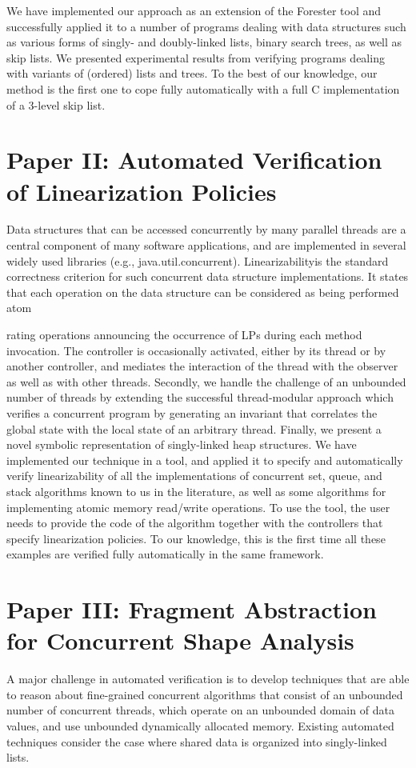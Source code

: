 We have implemented our approach as an extension of the Forester tool and successfully applied it to a number of programs dealing with data structures such as various forms of singly- and doubly-linked lists, binary search trees, as well as skip lists. We presented experimental results from verifying programs dealing with variants of (ordered) lists and trees. To the best of our knowledge, our method is the first one to cope fully automatically with a full C implementation of a 3-level skip list. 

\section{Paper II: Automated Verification of Linearization Policies} 
Data structures that can be accessed concurrently by many parallel threads are a central component of many software applications, and are implemented in several widely used libraries (e.g., java.util.concurrent). Linearizabilityis the standard correctness criterion for such concurrent data structure implementations. It states that each operation on the data structure can be considered as being performed atom





rating operations announcing the occurrence of
LPs during each method invocation. The controller is occasionally activated, either by
its thread or by another controller, and mediates the interaction of the thread with the
observer as well as with other threads. Secondly, we handle the challenge of an unbounded number of threads by extending the successful thread-modular approach which verifies a concurrent program by generating an invariant that correlates the global state with the local state of an arbitrary thread. Finally,  we present a novel symbolic representation of singly-linked heap structures.
We have implemented our technique in a tool, and applied it to specify and automatically verify linearizability of all the implementations of concurrent set, queue,
and stack algorithms known to us in the literature, as well as some algorithms for implementing atomic memory read/write operations. To use the tool, the user needs to
provide the code of the algorithm together with the controllers that specify linearization
policies. To our knowledge, this is the first time all these examples are verified fully
automatically in the same framework.
\section{Paper III: Fragment Abstraction for Concurrent Shape Analysis}  
A major challenge in automated verification is to develop techniques
that are able to reason about fine-grained concurrent algorithms that consist of
an unbounded number of concurrent threads, which operate on an unbounded
domain of data values, and use unbounded dynamically allocated memory. Existing automated techniques consider the case where shared data is organized into
singly-linked lists.

